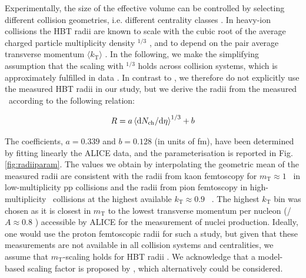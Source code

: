 \documentclass[a4paper,11pt]{scrartcl}
\begin{document}
Experimentally, the size of the effective volume can be controlled by selecting different collision geometries, i.e. different centrality classes \cite{Abelev:2013qoq}. In heavy-ion collisions the HBT radii are known to scale with the cubic root of the average charged particle multiplicity density \avdNdeta$^{1/3}$ \cite{Adam:2015vna}, and to depend on the pair average transverse momentum $\langle k_{\mathrm{T}}\rangle$ \cite{Aamodt:2011mr}. In the following, we make the simplifying assumption that the scaling with \avdNdeta$^{1/3}$ holds across collision systems, which is approximately fulfilled in data \cite{Adam:2015pya}. In contrast to \cite{Blum:2017qnn}, we therefore do not explicitly use the measured HBT radii in our study, but we derive the radii from the measured \avdNdeta~according to the following relation:

\begin{equation}
R = a \left<\mathrm{d}N_\mathrm{ch}/\mathrm{d}\eta\right>^{1/3} + b
\label{eq:radiusParameterisation}
\end{equation}

The coefficients, $a = 0.339$ and $b = 0.128$ (in units of fm), have been determined by fitting linearly the ALICE data, and the parameterisation is reported in Fig. \ref{fig:radiiparam}. 
The values we obtain by interpolating the geometric mean of the measured radii are consistent with the radii from kaon femtoscopy for $m_{\mathrm{T}} \approx 1$ \GeVc~in low-multiplicity pp collisions \cite{Abelev:2012sq} and the radii from pion femtoscopy in high-multiplicity \PbPb~collisions at the highest available $k_{\mathrm{T}} \approx 0.9$ \GeVc~\cite{Adam:2015vna}. 
The highest $k_{\mathrm{T}}$ bin was chosen as it is closest in $m_{\mathrm{T}}$ to the lowest transverse momentum per nucleon (\pt/$A \approx 0.8$ \GeVc) accessible by ALICE for the measurement of nuclei production. 
Ideally, one would use the proton femtoscopic radii for such a study, but given that these measurements are not  available in all collision systems and centralities, we assume that $m_{\mathrm{T}}$-scaling holds for HBT radii \cite{Adam:2015vja}. We acknowledge that a model-based scaling factor is proposed by \cite{Kisiel:2014upa}, which alternatively could be considered.
\end{document}
